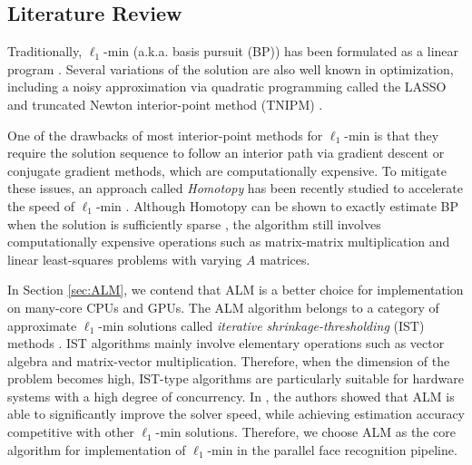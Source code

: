 \documentclass[preprint]{sigplanconf}
\begin{document}
\subsection{Literature Review} 
Traditionally, $\ell_1$-min (a.k.a.
basis pursuit (BP)) has been formulated as a linear program
\cite{ChenS2001-SIAM}. Several variations of the solution are also well known
in optimization, including a noisy approximation via quadratic programming
called the LASSO \cite{TibshiraniR1996} and truncated Newton interior-point
method (TNIPM) \cite{KimS2007}.

One of the drawbacks of most interior-point methods for $\ell_1$-min is that they require the solution sequence to follow an
interior path via gradient descent or conjugate gradient methods, which are computationally expensive.
To mitigate these issues, an approach called \emph{Homotopy} has been recently studied to accelerate the
speed of $\ell_1$-min \cite{OsborneM2000,EfronB2004,MalioutovD2005,DonohoD2006}.
Although Homotopy can be shown to exactly estimate BP when the solution is
sufficiently sparse \cite{DonohoD2006}, the algorithm still involves
computationally expensive operations such as matrix-matrix multiplication and
linear least-squares problems with varying $A$
matrices.



In Section \ref{sec:ALM}, we contend that ALM is a better choice for
implementation on many-core CPUs and GPUs. The ALM algorithm belongs to a
category of approximate $\ell_1$-min solutions called \emph{iterative
shrinkage-thresholding} (IST) methods \cite{WrightS2008,BeckA2009}.  IST
algorithms mainly involve elementary operations such as vector algebra and
matrix-vector multiplication. Therefore, when the dimension of the problem
becomes high, IST-type algorithms are particularly suitable for hardware
systems with a high degree of concurrency. In \cite{YangA2010-ICIP}, the
authors showed that ALM is able to significantly improve the solver speed,
while achieving estimation accuracy competitive with other $\ell_1$-min
solutions. Therefore, we choose ALM as the core algorithm for
implementation of $\ell_1$-min in the parallel face recognition pipeline.
\end{document}
